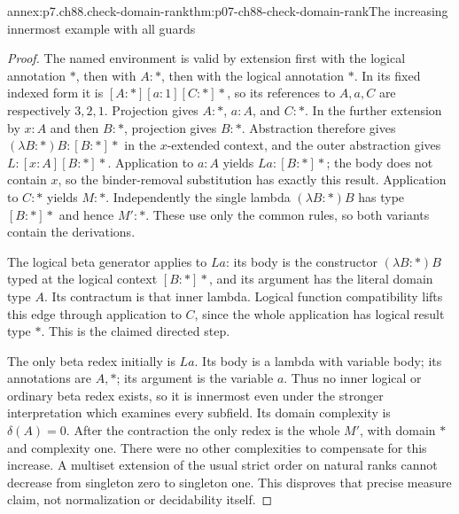 \begin{annexitem}{annex:p7.ch88.check-domain-rank}{thm:p07-ch88-check-domain-rank}{The increasing innermost example with all guards}
\begin{proof}
The named environment is valid by extension first with the logical
annotation \(\ast\), then with \(A:\ast\), then with the logical
annotation \(\ast\). In its fixed indexed form it is
\([A:\ast][a:1][C:\ast]\ast\), so its references to \(A,a,C\)
are respectively \(3,2,1\). Projection gives \(A:\ast\),
\(a:A\), and \(C:\ast\). In the further extension by \(x:A\)
and then \(B:\ast\), projection gives \(B:\ast\). Abstraction
therefore gives \((\lambda B:\ast)B:[B:\ast]\ast\) in the
\(x\)-extended context, and the outer abstraction gives
\(L:[x:A][B:\ast]\ast\). Application to \(a:A\) yields
\(La:[B:\ast]\ast\); the body does not contain \(x\), so the
binder-removal substitution has exactly this result. Application to
\(C:\ast\) yields \(M:\ast\). Independently the single lambda
\((\lambda B:\ast)B\) has type \([B:\ast]\ast\) and hence
\(M':\ast\). These use only the common rules, so both variants
contain the derivations.

The logical beta generator applies to \(La\): its body is the
constructor \((\lambda B:\ast)B\) typed at the logical context
\([B:\ast]\ast\), and its argument has the literal domain type
\(A\). Its contractum is that inner lambda. Logical function
compatibility lifts this edge through application to \(C\), since
the whole application has logical result type \(\ast\). This is
the claimed directed step.

The only beta redex initially is \(La\). Its body is a lambda with
variable body; its annotations are \(A,\ast\); its argument is the
variable \(a\). Thus no inner logical or ordinary beta redex exists,
so it is innermost even under the stronger interpretation which
examines every subfield. Its domain complexity is
\(\delta(A)=0\). After the contraction the only redex is the whole
\(M'\), with domain \(\ast\) and complexity one. There were no
other complexities to compensate for this increase. A multiset
extension of the usual strict order on natural ranks cannot decrease
from singleton zero to singleton one. This disproves that precise
measure claim, not normalization or decidability itself.
\end{proof}
\end{annexitem}

